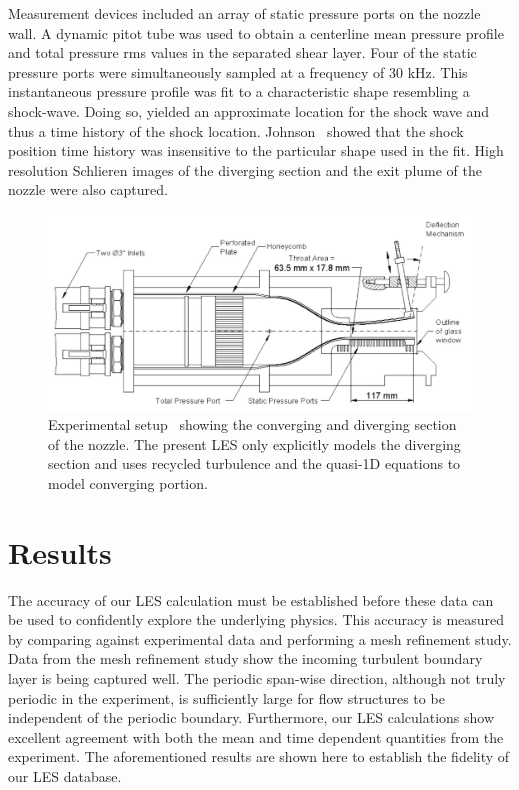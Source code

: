 \documentclass[]{aiaa-tc}%
\begin{document}
Measurement devices included an array of static pressure ports on the nozzle wall.  A dynamic pitot tube was used to obtain a centerline mean pressure profile and total pressure rms values in the separated shear layer.  Four of the static pressure ports were simultaneously sampled at a frequency of 30 kHz.  This instantaneous pressure profile was fit to a characteristic shape resembling a shock-wave.  Doing so, yielded an approximate location for the shock wave and thus a time history of the shock location.  Johnson~\cite{Papam:10} showed that the shock position time history was insensitive to the particular shape used in the fit.  High resolution Schlieren images of the diverging section and the exit plume of the nozzle were also captured.


\begin{figure}[!h]%
	\centering
  	\includegraphics[width = 6in]{../../data/experiment/exp_setup.png}
	\caption{Experimental setup~\cite{Papam:10} showing the converging and diverging section of the nozzle.  The present LES only explicitly models the diverging section and uses recycled turbulence and the quasi-1D equations to model converging portion. }
 	\label{fig:exp_setup}
\end{figure}


\clearpage
\section{Results}

The accuracy of our LES calculation must be established before these data can be used to confidently explore the underlying physics.  This accuracy is measured by comparing against experimental data and performing a mesh refinement study.  Data from the mesh refinement study show the incoming turbulent boundary layer is being captured well.  The periodic span-wise direction, although not truly periodic in the experiment, is sufficiently large for flow structures to be independent of the periodic boundary.  Furthermore, our LES calculations show excellent agreement with both the mean and time dependent quantities from the experiment.  The aforementioned results are shown here to establish the fidelity of our LES database.
\end{document}
